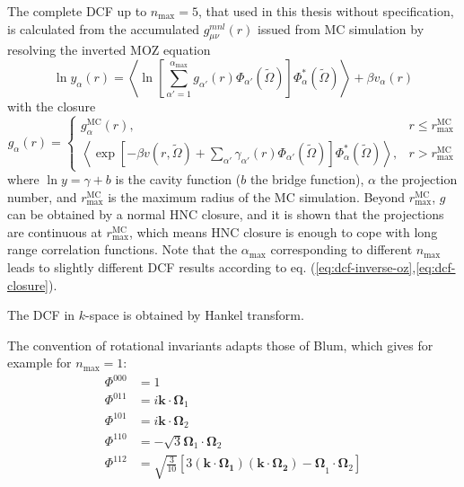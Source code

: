 The complete \acs{DCF} up to $n_{\max}=5$, that used in this thesis
without specification, is calculated from the accumulated $g_{\mu\nu}^{mnl}(r)$
issued from \acs{MC} simulation \citep{puibasset_bridge_2012} by
resolving the inverted \acs{MOZ} equation
\begin{equation}
\ln y_{\alpha}(r)=\left\langle \ln\left[\sum_{\alpha'=1}^{\alpha_{\max}}g_{\alpha'}(r)\Phi_{\alpha'}(\tilde{\Omega})\right]\Phi_{\alpha}^{*}(\tilde{\Omega})\right\rangle +\beta v_{\alpha}(r)\label{eq:dcf-inverse-oz}
\end{equation}
with the closure
\begin{equation}
g_{\alpha}(r)=\begin{cases}
g_{\alpha}^{\mathrm{MC}}(r), & r\leq r_{\max}^{\mathrm{MC}}\\
\left\langle \exp\left[-\beta v(r,\tilde{\Omega})+\sum_{\alpha'}\gamma_{\alpha'}(r)\Phi_{\alpha'}(\tilde{\Omega})\right]\Phi_{\alpha}^{*}(\tilde{\Omega})\right\rangle , & r>r_{\max}^{\mathrm{MC}}
\end{cases}\label{eq:dcf-closure}
\end{equation}
where $\ln y=\gamma+b$ is the cavity function ($b$ the bridge function),
$\alpha$ the projection number, and $r_{\max}^{\mathrm{MC}}$ is
the maximum radius of the \acs{MC} simulation. Beyond $r_{\max}^{\mathrm{MC}}$,
$g$ can be obtained by a normal \acs{HNC} closure, and it is shown
that the projections are continuous at $r_{\max}^{\mathrm{MC}}$,
which means \acs{HNC} closure is enough to cope with long range correlation
functions. Note that the $\alpha_{\max}$ corresponding to different
$n_{\max}$ leads to slightly different \acs{DCF} results according
to eq. (\ref{eq:dcf-inverse-oz},\ref{eq:dcf-closure}). 

The \acs{DCF} in $k$-space is obtained by Hankel transform.

The convention of rotational invariants adapts those of Blum, which
gives for example for $n_{\max}=1$:
\begin{align}
\Phi^{000} & =1\nonumber \\
\Phi^{011} & =i\mathbf{k}\cdot\mathbf{\Omega}_{1}\nonumber \\
\Phi^{101} & =i\mathbf{k}\cdot\mathbf{\Omega}_{2}\nonumber \\
\Phi^{110} & =-\sqrt{3}\mathbf{\Omega}_{1}\cdot\mathbf{\Omega}_{2}\\
\Phi^{112} & =\sqrt{\frac{3}{10}}\left[3\mathbf{(\mathbf{k}\cdot\mathbf{\Omega}_{1})(\mathbf{k}\cdot\mathbf{\Omega}_{2})-\Omega}_{1}\cdot\mathbf{\Omega}_{2}\right]\nonumber 
\end{align}


